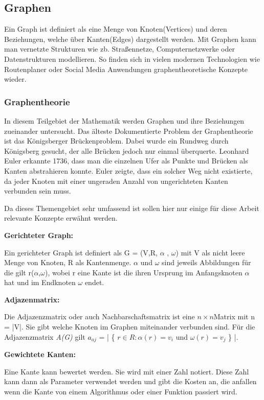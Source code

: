 \subsection{Graphen}

Ein Graph ist definiert als eine Menge von Knoten(Vertices) und deren Beziehungen, welche über Kanten(Edges) dargestellt werden. Mit Graphen kann man vernetzte Strukturen wie zb. Straßennetze, Computernetzwerke oder Datenstrukturen modellieren. So finden sich in vielen modernen Technologien wie Routenplaner oder Social Media Anwendungen graphentheoretische Konzepte wieder.
	\subsubsection{Graphentheorie}
	In diesem Teilgebiet der Mathematik werden Graphen und ihre Beziehungen zueinander untersucht. Das älteste Dokumentierte Problem der Graphentheorie ist das Königsberger Brückenproblem. Dabei wurde ein Rundweg durch Königsberg gesucht, der alle Brücken jedoch nur einmal überquerte. Leonhard Euler erkannte 1736, dass man die einzelnen Ufer als Punkte und Brücken als Kanten abstrahieren konnte. Euler zeigte, dass ein solcher Weg nicht existierte, da jeder Knoten mit einer ungeraden Anzahl von ungerichteten Kanten verbunden sein muss.
	
	Da dieses Themengebiet sehr umfassend ist sollen hier nur einige für diese Arbeit relevante Konzepte erwähnt werden.
	
	\textbf{Gerichteter Graph: }
	
	Ein gerichteter Graph ist definiert als G = (V,R, $\alpha$ , $\omega$) mit V als nicht leere Menge von Knoten, R als Kantenmenge.  $\alpha$ und $\omega$ sind jeweils Abbildungen für die gilt r($\alpha$,$\omega$), wobei r eine Kante ist die ihren Ursprung im Anfangsknoten $\alpha$ hat und im Endknoten $\omega$ endet.
	
	\textbf{Adjazenmatrix:}
	
	Die Adjazenzmatrix oder auch Nachbarschaftsmatrix ist eine  $n\times n $Matrix mit n = |V|. Sie gibt welche Knoten im Graphen miteinander verbunden sind. Für die Adjazenzmatrix \textit{A(G)} gilt $a_{aj}$ = | \{ $r \in R: \alpha(r) = v_{i}$ und $\omega(r) = v_{j} $ \} |. 
	
	\textbf{Gewichtete Kanten:}
	
	Eine Kante kann bewertet werden. Sie wird mit einer Zahl notiert. Diese Zahl kann dann als Parameter verwendet werden und gibt die Kosten an, die anfallen wenn die Kante von einem Algorithmus oder einer Funktion passiert wird.
	
